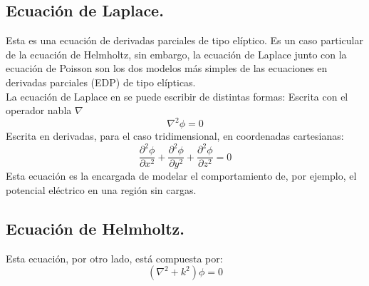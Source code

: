 \subsection{Ecuación de Laplace.}
Esta es una ecuación de derivadas parciales de tipo elíptico. Es un caso particular de la ecuación de Helmholtz, sin embargo, la ecuación de Laplace junto con la ecuación de Poisson son los dos modelos más simples de las ecuaciones en derivadas parciales (EDP) de tipo elípticas.\\
La ecuación de Laplace en se puede escribir de distintas formas:
Escrita con el operador nabla $\nabla$
\begin{equation}
\nabla^2\phi=0
\end{equation}
Escrita en derivadas, para el caso tridimensional, en coordenadas cartesianas:
\begin{equation}
\frac{\partial^2 \phi}{\partial x^2}+\frac{\partial^2 \phi}{\partial y^2}+\frac{\partial^2 \phi}{\partial z^2}=0
\end{equation}
Esta ecuación es la encargada de modelar el comportamiento de, por ejemplo, el potencial eléctrico en una región sin cargas.
\subsection{Ecuación de Helmholtz.}
Esta ecuación, por otro lado, está compuesta por:
\begin{equation}
(\nabla^2+k^2)\phi=0
\end{equation}